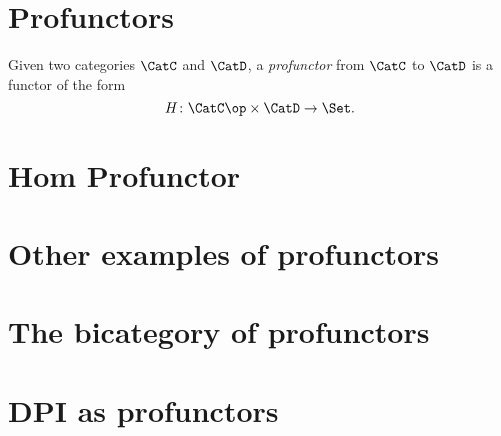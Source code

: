 


\section{Profunctors}

\begin{ctdefinition}[Profunctor]
\label{def:profunctor}
Given two categories $\CatC$ and $\CatD$, a \emph{profunctor} from $\CatC$ to $\CatD$ is a functor of the form
\begin{equation}
    H\colon \CatC\op \times \CatD \to \Set.
\end{equation}
\end{ctdefinition}


\section{Hom Profunctor}




\section{Other examples of profunctors}




\section{The bicategory of profunctors}


\section{DPI as profunctors}
